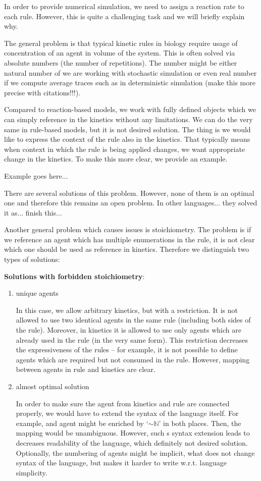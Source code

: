 \documentclass[12pt]{fithesis2}
\begin{document}
In order to provide numerical simulation, we need to assign a reaction rate to each rule. However, this is quite a challenging task and we will briefly explain why.

The general problem is that typical kinetic rules in biology require usage of concentration of an agent in volume of the system. This is often solved via absolute numbers (the number of repetitions). The number might be either natural number of we are working with stochastic simulation or even real number if we compute average traces such as in deterministic simulation (make this more precise with citations!!!).

Compared to reaction-based models, we work with fully defined objects which we can simply reference in the kinetics without any limitations. We can do the very same in rule-based models, but it is not desired solution. The thing is we would like to express the context of the rule also in the kinetics. That typically means when context in which the rule is being applied changes, we want appropriate change in the kinetics. To make this more clear, we provide an example.

Example goes here...

There are several solutions of this problem. However, none of them is an optimal one and therefore this remains an open problem. In other languages... they solved it as... finish this...

Another general problem which causes issues is stoichiometry. The problem is if we reference an agent which has multiple enumerations in the rule, it is not clear which one should be used as reference in kinetics. Therefore we distinguish two types of solutions:

\textbf{Solutions with forbidden stoichiometry}:

\begin{enumerate}
\item unique agents

In this case, we allow arbitrary kinetics, but with a restriction. It is not allowed to use two identical agents in the same rule (including both sides of the rule). Moreover, in kinetics it is allowed to use only agents which are already used in the rule (in the very same form). This restriction decreases the expressiveness of the rules -- for example, it is not possible to define agents which are required but not consumed in the rule. However, mapping between agents in rule and kinetics are clear.

\item almost optimal solution

In order to make sure the agent from kinetics and rule are connected properly, we would have to extend the syntax of the language itself. For example, and agent might be enriched by `$\sim\mathbb{N}$' in both places. Then, the mapping would be unambiguous. However, such s syntax extension leads to decreases readability of the language, which definitely not desired solution. Optionally, the numbering of agents might be implicit, what does not change syntax of the language, but makes it harder to write w.r.t. language simplicity.

\end{enumerate}
\end{document}
